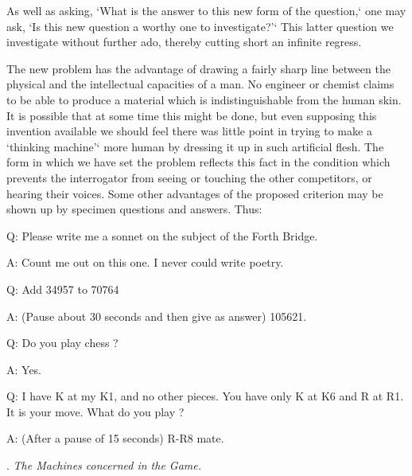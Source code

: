 \documentclass[10pt]{article} %
\newcommand{\dialogueturn}[2]{%
    \noindent\normalfont #1: #2\par %
    \vspace{0.2\baselineskip}%
}
\begin{document}
As well as asking, `What is the answer to this new form of the question,` one may ask, `Is this new question a worthy one to investigate?'` This latter question we investigate without further ado, thereby cutting short an infinite regress.

The new problem has the advantage of drawing a fairly sharp line between the physical and the intellectual capacities of a man. No engineer or chemist claims to be able to produce a material which is indistinguishable from the human skin. It is possible that at some time this might be done, but even supposing this invention available we should feel there was little point in trying to make a `thinking machine'` more human by dressing it up in such artificial flesh. The form in which we have set the problem reflects this fact in the condition which prevents the interrogator from seeing or touching the other competitors, or hearing their voices. Some other advantages of the proposed criterion may be shown up by specimen questions and answers. Thus:

\vspace{0.5\baselineskip} %
\dialogueturn{Q}{Please write me a sonnet on the subject of the Forth Bridge.}%
\dialogueturn{A}{Count me out on this one. I never could write poetry.}%
\dialogueturn{Q}{Add 34957 to 70764}%
\dialogueturn{A}{(Pause about 30 seconds and then give as answer) 105621.}%
\dialogueturn{Q}{Do you play chess ?}%
\dialogueturn{A}{Yes.}%

\vspace{0.5\baselineskip} %
\dialogueturn{Q}{I have K at my K1, and no other pieces. You have only K at K6 and R at R1. It is your move. What do you play ?}%
\dialogueturn{A}{(After a pause of 15 seconds) R-R8 mate.}%

\vspace{0.5\baselineskip} %
\noindent{}. \textit{The Machines concerned in the Game.}
\vspace{0.5\baselineskip} %
\end{document}
